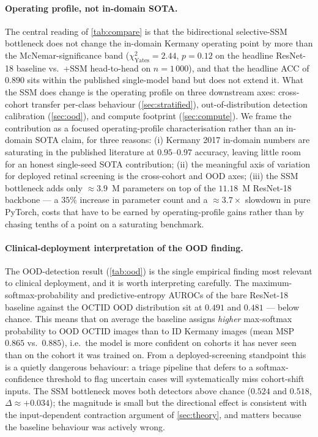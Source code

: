 \documentclass[5p]{elsarticle}
\begin{document}
\paragraph{Operating profile, not in-domain SOTA.}
The central reading of \cref{tab:compare} is that the bidirectional selective-SSM bottleneck does not change the in-domain Kermany operating point by more than the McNemar-significance band ($\chi^2_{\text{Yates}}=2.44$, $p=0.12$ on the headline ResNet-18 baseline vs.\ +SSM head-to-head on $n=1\,000$), and that the headline ACC of $0.890$ sits within the published single-model band but does not extend it. What the SSM does change is the operating profile on three downstream axes: cross-cohort transfer per-class behaviour (\cref{sec:stratified}), out-of-distribution detection calibration (\cref{sec:ood}), and compute footprint (\cref{sec:compute}). We frame the contribution as a focused operating-profile characterisation rather than an in-domain SOTA claim, for three reasons: (i) Kermany 2017 in-domain numbers are saturating in the published literature at $0.95$--$0.97$ accuracy, leaving little room for an honest single-seed SOTA contribution; (ii) the meaningful axis of variation for deployed retinal screening is the cross-cohort and OOD axes; (iii) the SSM bottleneck adds only $\approx 3.9$~M parameters on top of the $11.18$~M ResNet-18 backbone --- a $35\%$ increase in parameter count and a $\approx 3.7\times$ slowdown in pure PyTorch, costs that have to be earned by operating-profile gains rather than by chasing tenths of a point on a saturating benchmark.

\paragraph{Clinical-deployment interpretation of the OOD finding.}
The OOD-detection result (\cref{tab:ood}) is the single empirical finding most relevant to clinical deployment, and it is worth interpreting carefully. The maximum-softmax-probability and predictive-entropy AUROCs of the bare ResNet-18 baseline against the OCTID OOD distribution sit at $0.491$ and $0.481$ --- below chance. This means that on average the baseline assigns \emph{higher} max-softmax probability to OOD OCTID images than to ID Kermany images (mean MSP $0.865$ vs.\ $0.885$), i.e.\ the model is more confident on cohorts it has never seen than on the cohort it was trained on. From a deployed-screening standpoint this is a quietly dangerous behaviour: a triage pipeline that defers to a softmax-confidence threshold to flag uncertain cases will systematically miss cohort-shift inputs. The SSM bottleneck moves both detectors above chance ($0.524$ and $0.518$, $\Delta \approx +0.034$); the magnitude is small but the directional effect is consistent with the input-dependent contraction argument of \cref{sec:theory}, and matters because the baseline behaviour was actively wrong.
\end{document}
